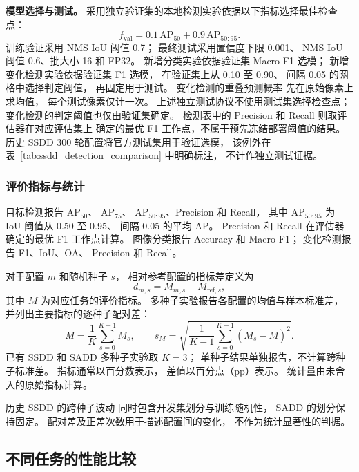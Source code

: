 \documentclass[journal]{IEEEtran}
\begin{document}
\textbf{模型选择与测试。}
采用独立验证集的本地检测实验依据以下指标选择最佳检查点：
\begin{equation}
f_{\mathrm{val}}
=0.1\,\mathrm{AP}_{50}
+0.9\,\mathrm{AP}_{50:95}.
\label{eq:selection_fitness}
\end{equation}
训练验证采用 NMS IoU 阈值 0.7；
最终测试采用置信度下限 0.001、
NMS IoU 阈值 0.6、批大小 16 和 FP32。
新增分类实验依据验证集 Macro-F1 选模；
新增变化检测实验依据验证集 F1 选模，
在验证集上从 0.10 至 0.90、
间隔 0.05 的网格中选择判定阈值，
再固定用于测试。
变化检测的重叠预测概率
先在原始像素上求均值，
每个测试像素仅计一次。
上述独立测试协议不使用测试集选择检查点；
变化检测的判定阈值也仅由验证集确定。
检测表中的 Precision 和 Recall 则取评估器在对应评估集上
确定的最优 F1 工作点，不属于预先冻结部署阈值的结果。
历史 SSDD 300 轮配置将官方测试集用于验证选模，
该例外在表~\ref{tab:ssdd_detection_comparison} 中明确标注，
不计作独立测试证据。

\subsubsection{评价指标与统计}
\label{sec:evaluation_metrics}

目标检测报告 $\mathrm{AP}_{50}$、
$\mathrm{AP}_{75}$、
$\mathrm{AP}_{50:95}$、Precision 和 Recall，
其中 $\mathrm{AP}_{50:95}$
为 IoU 阈值从 0.50 至 0.95、
间隔 0.05 的平均 AP。
Precision 和 Recall
在评估器确定的最优 F1 工作点计算。
图像分类报告 Accuracy 和 Macro-F1；
变化检测报告 F1、IoU、OA、
Precision 和 Recall。

对于配置 $m$ 和随机种子 $s$，
相对参考配置的指标差定义为
\begin{equation}
d_{m,s}=M_{m,s}-M_{\mathrm{ref},s},
\label{eq:paired_difference}
\end{equation}
其中 $M$ 为对应任务的评价指标。
多种子实验报告各配置的均值与样本标准差，
并列出主要指标的逐种子配对差：
\begin{equation}
\bar M=\frac{1}{K}\sum_{s=0}^{K-1}M_s,\qquad
s_M=\sqrt{
\frac{1}{K-1}
\sum_{s=0}^{K-1}(M_s-\bar M)^2
}.
\label{eq:experiment_statistics}
\end{equation}
已有 SSDD 和 SADD 多种子实验取 $K=3$；
单种子结果单独报告，不计算跨种子标准差。
指标通常以百分数表示，
差值以百分点（pp）表示。
统计量由未舍入的原始指标计算。

历史 SSDD 的跨种子波动
同时包含开发集划分与训练随机性，
SADD 的划分保持固定。
配对差及正差次数用于描述配置间的变化，
不作为统计显著性的判据。
\subsection{不同任务的性能比较}
\label{sec:performance_comparison}
\end{document}

